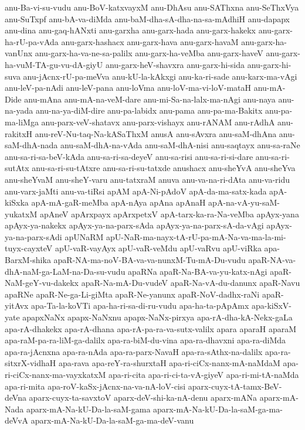 {anu-Ba-vi-su-vudu
anu-BoV-katxvayxM
anu-DhAsu
anu-SAThxna
anu-SeThxVya
anu-SuTxpf
anu-bA-va-diMda
anu-baM-dha-sA-dha-na-sa-mAdhiH
anu-dapapx
anu-dina
anu-gaq-hANxti
anu-garxha
anu-garx-hada
anu-garx-hakekx
anu-garx-ha-rU-pa-vAda
anu-garx-hashacx
anu-garx-hava
anu-garx-havaM
anu-garx-ha-vanUnx
anu-garx-ha-va-ne-sa-palilx
anu-garx-ha-veMba
anu-garx-haveV
anu-garx-ha-vuM-TA-gu-vu-dA-giyU
anu-garx-heV-shavxra
anu-garx-hi-sida
anu-garx-hi-suva
anu-jAcnx-rU-pa-meVva
anu-kU-la-kAkxgi
anu-ka-ri-sade
anu-karx-ma-vAgi
anu-leV-pa-nAdi
anu-leV-pana
anu-loVma
anu-loV-ma-vi-loV-mataH
anu-mA-Dide
anu-mAna
anu-mA-na-veM-dare
anu-mi-Sa-na-lalx-ma-nAgi
anu-naya
anu-na-yada
anu-na-ya-diM-dire
anu-pa-labidx
anu-pama
anu-pa-ma-Bakitx
anu-pa-ma-liMga
anu-parx-veV-shatavx
anu-parx-vishayx
anu-rANAM
anu-rAdhA
anu-rakitxH
anu-reV-Nu-taq-Na-kASaThxM
anusA
anu-sAvxra
anu-saM-dhAna
anu-saM-dhA-nada
anu-saM-dhA-na-vAda
anu-saM-dhA-nisi
anu-saqtayx
anu-sa-raNe
anu-sa-ri-sa-beV-kAda
anu-sa-ri-sa-deyeV
anu-sa-risi
anu-sa-ri-si-dare
anu-sa-ri-sutAtx
anu-sa-ri-su-tAtxre
anu-sa-ri-su-tatxde
anushacx
anu-sheYvA
anu-sheYva
anu-sheYvaM
anu-sheY-varu
anu-tatxraM
anuva
anu-va-na-ri-dAta
anu-va-ridu
anu-varx-jaMti
anu-va-tiRsi
apAM
apA-Ni-pAdoV
apA-da-ma-satx-kada
apA-kiSxka
apA-mA-gaR-meMba
apA-nAya
apAna
apAnaH
apA-na-vA-yu-saM-yukatxM
apAneV
apArxpayx
apArxpetxV
apA-tarx-ka-ra-Na-veMba
apAyx-yana
apAyx-ya-nakekx
apAyx-ya-na-parx-sAda
apAyx-ya-na-parx-sA-da-vAgi
apAyx-ya-na-parx-sAdi
apUNaRM
apU-NaR-ma-nayx-tA-rU-pa-mA-Na-va-ma-la-mi-tuyx-cayxteV
apU-vaR-vayAyx
apU-vaR-veMdu
apU-vaRvu
apU-viRka
apa-BarxM-shika
apaR-NA-ma-noV-BA-va-va-nunxM-Tu-mA-Du-vudu
apaR-NA-va-dhA-naM-ga-LaM-na-Da-su-vudu
apaRNa
apaR-Na-BA-va-yu-katx-nAgi
apaR-NaM-geY-vu-dakekx
apaR-Na-mA-Du-vudeV
apaR-Na-vA-du-danunx
apaR-Navu
apaRNe
apaR-Ne-ga-Li-giMta
apaR-Ne-yanunx
apaR-NoV-dadhx-raNi
apaR-yitAvx
apa-Ta-la-koVTi
apa-ha-ri-sa-di-ru-vudu
apa-ha-ta-pApAmx
apa-kiSxV-yate
apapxNaNx
apapx-NaNxnu
apapx-NaNx-pirxya
apa-rA-dha-kA-Nekx-gaLa
apa-rA-dhakekx
apa-rA-dhana
apa-rA-pa-ra-va-sutx-valilx
apara
aparaH
aparaM
apa-raM-pa-ra-liM-ga-dalilx
apa-ra-biM-du-vina
apa-ra-dhavxni
apa-ra-diMda
apa-ra-jAcnxna
apa-ra-nAda
apa-ra-parx-NavaH
apa-ra-sAthx-na-dalilx
apa-ra-sitxrX-vidhaH
apa-rava
apa-reY-ra-shurxtaH
apa-ri-ciCx-nanx-mA-naMdaM
apa-ri-ciCx-nanx-ma-vayxkatxM
apa-ri-cita
apa-ri-ci-ta-vA-giyeV
apa-ri-mi-tA-naMda
apa-ri-mita
apa-roV-kaSx-jAcnx-na-va-nA-loV-cisi
aparx-cuyx-tA-tamx-BeV-deVna
aparx-cuyx-ta-savxtoV
aparx-deV-shi-ka-nA-denu
aparx-mANa
aparx-mA-Nada
aparx-mA-Na-kU-Da-la-saM-gama
aparx-mA-Na-kU-Da-la-saM-ga-ma-deVvA
aparx-mA-Na-kU-Da-la-saM-ga-ma-deV-vanu
}
